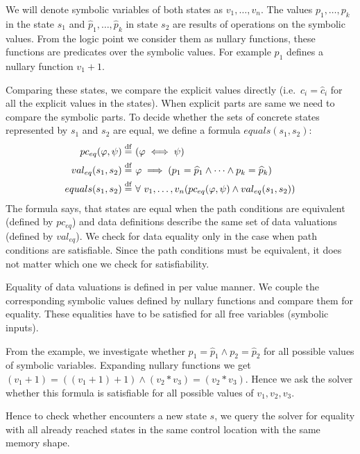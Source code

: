 We will denote symbolic variables of both states as $v_1, \dots, v_n$. The
values $p_1, \dots, p_k$ in the state $s_1$ and $\widehat{p}_1, \dots,
\widehat{p}_k$ in state $s_2$ are results of operations on the symbolic
values. From the logic point we consider them as nullary functions, these
functions are predicates over the symbolic values. For example $p_1$ defines
a nullary function $v_1 + 1$.

Comparing these states, we compare the explicit values directly (i.e.~$c_i =
\widehat{c}_i$ for all the explicit values in the states).  When explicit parts
are same we need to compare the symbolic parts. To decide whether the sets of
concrete states represented by $s_1$ and $s_2$ are equal, we define a formula
$equals(s_1, s_2)$:
\begin{equation*}
\begin{aligned}
    pc_{eq}(\varphi, \psi) \stackrel{\mathrm{df}}{=} & ~(\varphi \iff \psi) \\
    val_{eq}(s_1, s_2) \stackrel{\mathrm{df}}{=} & ~\varphi \implies (p_1 = \widehat{p}_1 \wedge \dots \wedge p_k = \widehat{p}_k ) \\
    equals(s_1, s_2) \stackrel{\mathrm{df}}{=} & ~\forall~v_1,\dots, v_n (pc_{eq}(\varphi, \psi)
    \wedge val_{eq}(s_1, s_2))
\end{aligned}
\end{equation*}
The formula says, that states are equal when the path conditions are
equivalent (defined by $pc_{eq}$) and data definitions describe the same set
of data valuations (defined by $val_{eq}$). We check for data equality only in
the case when path conditions are satisfiable. Since the path conditions must
be equivalent, it does not matter which one we check for satisfiability.

Equality of data valuations is defined in per value manner. We couple the
corresponding symbolic values defined by nullary functions and compare them for
equality. These equalities have to be satisfied for all free variables (symbolic
inputs).

From the example, we investigate whether $p_1 = \widehat{p}_1 \wedge p_2 =
\widehat{p}_2$ for all possible values of symbolic variables. Expanding nullary
functions we get $(v_1 + 1) = ((v_1 + 1) + 1) \wedge (v_2 * v_3) = (v_2 * v_3)$. Hence
we ask the \SMT solver whether this formula is satisfiable for all possible
values of $v_1, v_2, v_3$.

Hence to check whether \DIVINE encounters a new state $s$, we query the \SMT solver
for equality with all already reached states in the same control location with the same memory shape.




